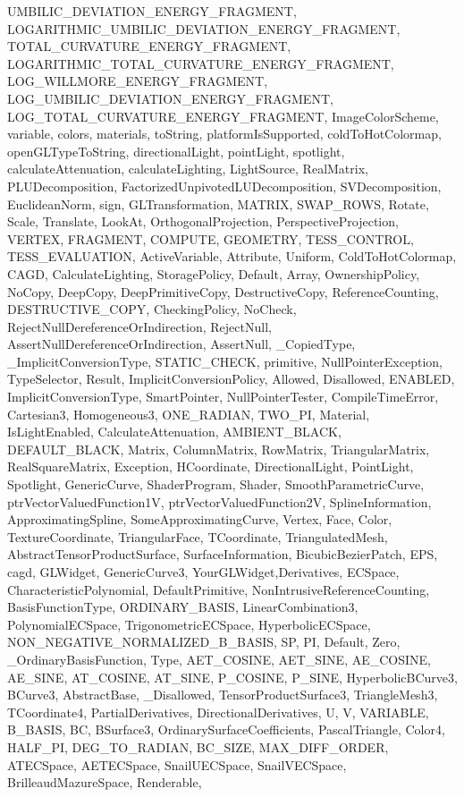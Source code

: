 {{{            UMBILIC_DEVIATION_ENERGY_FRAGMENT,
            LOGARITHMIC_UMBILIC_DEVIATION_ENERGY_FRAGMENT,
            TOTAL_CURVATURE_ENERGY_FRAGMENT,
            LOGARITHMIC_TOTAL_CURVATURE_ENERGY_FRAGMENT,
            LOG_WILLMORE_ENERGY_FRAGMENT,
            LOG_UMBILIC_DEVIATION_ENERGY_FRAGMENT,
            LOG_TOTAL_CURVATURE_ENERGY_FRAGMENT,
            ImageColorScheme,
            variable,
            colors, materials, toString, platformIsSupported, coldToHotColormap, openGLTypeToString,
            directionalLight,
            pointLight,
            spotlight,
            calculateAttenuation,
            calculateLighting,
            LightSource,
            RealMatrix,
            PLUDecomposition,
            FactorizedUnpivotedLUDecomposition,
            SVDecomposition,
            EuclideanNorm,
            sign,
            GLTransformation,
            MATRIX,
            SWAP_ROWS,
            Rotate,
            Scale,
            Translate,
            LookAt,
            OrthogonalProjection,
            PerspectiveProjection,
            VERTEX,
            FRAGMENT,
            COMPUTE,
            GEOMETRY,
            TESS_CONTROL,
            TESS_EVALUATION,
            ActiveVariable,
            Attribute, Uniform,
            ColdToHotColormap,
			CAGD, CalculateLighting,
			StoragePolicy, Default, Array, OwnershipPolicy, NoCopy, DeepCopy, DeepPrimitiveCopy, DestructiveCopy, ReferenceCounting, DESTRUCTIVE_COPY,
			CheckingPolicy, NoCheck, RejectNullDereferenceOrIndirection, RejectNull, AssertNullDereferenceOrIndirection, AssertNull, _CopiedType, _ImplicitConversionType,
			STATIC_CHECK, primitive, NullPointerException, 
			TypeSelector, Result, ImplicitConversionPolicy, Allowed, Disallowed, ENABLED, ImplicitConversionType, SmartPointer, NullPointerTester, CompileTimeError, Cartesian3, Homogeneous3,
			ONE_RADIAN, TWO_PI, Material, IsLightEnabled, CalculateAttenuation, AMBIENT_BLACK, DEFAULT_BLACK,
			Matrix, ColumnMatrix, RowMatrix, TriangularMatrix, RealSquareMatrix, Exception, HCoordinate, DirectionalLight, PointLight, Spotlight,
			GenericCurve, ShaderProgram, Shader,
			SmoothParametricCurve,
			ptrVectorValuedFunction1V,
			ptrVectorValuedFunction2V,
			SplineInformation,
			ApproximatingSpline,
			SomeApproximatingCurve,
			Vertex, Face, Color, TextureCoordinate, TriangularFace, TCoordinate, TriangulatedMesh, AbstractTensorProductSurface, SurfaceInformation, BicubicBezierPatch,
			EPS, cagd, GLWidget, GenericCurve3, YourGLWidget,Derivatives,
			ECSpace, CharacteristicPolynomial, DefaultPrimitive, NonIntrusiveReferenceCounting, BasisFunctionType, ORDINARY_BASIS, LinearCombination3, PolynomialECSpace, TrigonometricECSpace, HyperbolicECSpace, NON_NEGATIVE_NORMALIZED_B_BASIS, SP, PI, Default, Zero, _OrdinaryBasisFunction, Type, AET_COSINE, AET_SINE, AE_COSINE, AE_SINE, AT_COSINE, AT_SINE, P_COSINE, P_SINE, HyperbolicBCurve3, BCurve3, AbstractBase, _Disallowed, TensorProductSurface3, TriangleMesh3, TCoordinate4, PartialDerivatives, DirectionalDerivatives, U, V, VARIABLE, B_BASIS, BC, BSurface3, OrdinarySurfaceCoefficients, PascalTriangle, Color4, HALF_PI, DEG_TO_RADIAN, BC_SIZE, MAX_DIFF_ORDER, ATECSpace, AETECSpace, SnailUECSpace, SnailVECSpace, BrilleaudMazureSpace, Renderable}, 
}}
